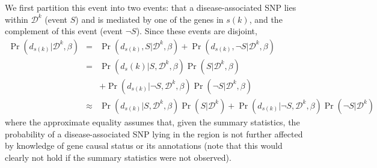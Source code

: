 We first partition this event into two events: that a disease-associated SNP
lies within $\mathcal{D}^k$ (event $S$) and is mediated by one of the genes in $s(k)$, and the complement of this event (event $\neg S$). Since these events are disjoint,
\begin{eqnarray*}
  \Pr\left(d_{s(k)}|\mathcal{D}^k,\beta\right)
  & = &
\Pr\left(d_{s(k)},S|\mathcal{D}^k,\beta\right) +
\Pr\left(d_{s(k)},\neg S|\mathcal{D}^k,\beta\right)
  \\
  & = &
\Pr\left(d_s(k)|S,\mathcal{D}^k,\beta\right)\Pr\left(S|\mathcal{D}^k,\beta\right)
\\
& & +
\Pr\left(d_{s(k)}|\neg
S,\mathcal{D}^k,\beta\right)\Pr\left(\neg S|\mathcal{D}^k,\beta\right)
\\
  & \approx &
\Pr\left(d_{s(k)}|S,\mathcal{D}^k,\beta\right)\Pr\left(S|\mathcal{D}^k\right) + 
\Pr\left(d_{s(k)}|\neg
S,\mathcal{D}^k,\beta\right)\Pr\left(\neg S|\mathcal{D}^k\right)
\end{eqnarray*}
where the approximate equality assumes that, given the summary statistics,
the probability of a disease-associated SNP lying in the region is not
further affected by knowledge of gene causal status or its annotations
(note that this would clearly not hold if the summary statistics were
not observed).

